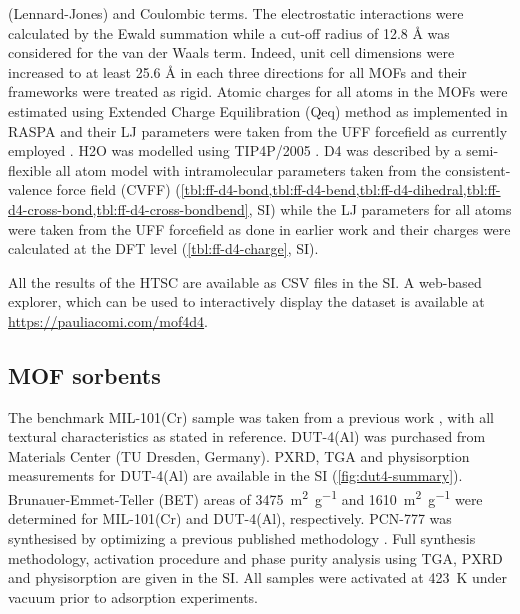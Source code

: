 (Lennard-Jones) and Coulombic terms. The electrostatic interactions were
calculated by the Ewald summation \citep{ewaldBerechnungOptischerUnd1921} while
a cut-off radius of 12.8 Å was considered for the van der Waals term. Indeed,
unit cell dimensions were increased to at least 25.6 Å in each three directions
for all MOFs and their frameworks were treated as rigid. Atomic charges for all
atoms in the MOFs were estimated using Extended Charge Equilibration (Qeq)
method as implemented in RASPA \citep{dubbeldamRASPAMolecularSimulation2016} and
their LJ parameters were taken from the UFF forcefield as currently employed
\citep{qiaoHighthroughputComputationalScreening2017,
keskinProgressOpportunitiesChallenges2009}. H2O was modelled using TIP4P/2005
\citep{abascalGeneralPurposeModel2005}. D4 was described by a semi-flexible all
atom model with intramolecular parameters taken from the consistent-valence
force field (CVFF) \citep{dauber-osguthorpeStructureEnergeticsLigand1988}
(\cref{tbl:ff-d4-bond,tbl:ff-d4-bend,tbl:ff-d4-dihedral,tbl:ff-d4-cross-bond,tbl:ff-d4-cross-bondbend},
SI) while the LJ parameters for all atoms were taken from the UFF forcefield as
done in earlier work \citep{xuSolvationForceSimulations2014} and their charges
were calculated at the DFT level (\cref{tbl:ff-d4-charge}, SI).

All the results of the HTSC are available as CSV files in the SI. A web-based
explorer, which can be used to interactively display the dataset is available at
\url{https://pauliacomi.com/mof4d4}.

\subsection{MOF sorbents}\label{methodology-benchmark}

The benchmark MIL-101(Cr) sample was taken from a previous work
\citep{pillaiCapturePerformancesHybrid2017}, with all textural characteristics
as stated in reference. DUT-4(Al) was purchased from Materials Center (TU Dresden,
Germany). PXRD, TGA and  physisorption measurements for DUT-4(Al) are
available in the SI (\cref{fig:dut4-summary}). Brunauer-Emmet-Teller (BET) areas
of \SI{3475}{\metre\squared\per\gram} and \SI{1610}{\metre\squared\per\gram}
were determined for MIL-101(Cr) and DUT-4(Al), respectively. PCN-777 was synthesised
by optimizing a previous published methodology
\citep{fengHighlyStableZeotype2015}. Full synthesis methodology, activation
procedure and phase purity analysis using TGA, PXRD and  physisorption
are given in the SI. All samples were activated at \SI{423}{\kelvin} under
vacuum prior to adsorption experiments.

